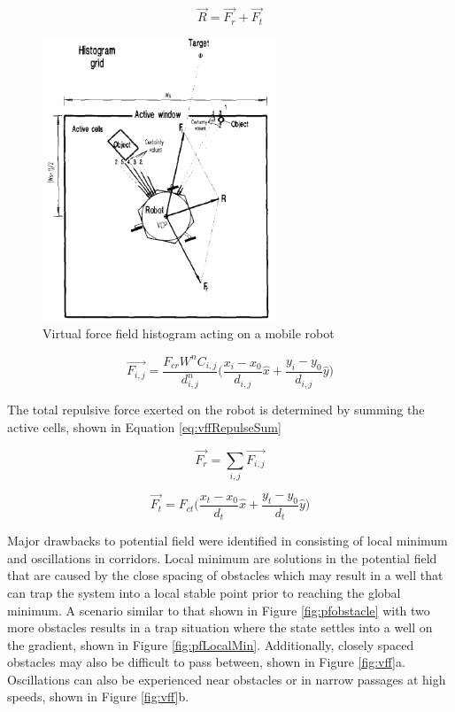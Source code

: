 \documentclass[numbered,pdftex]{ohio-etd}
\begin{document}
\begin{equation}\label{eq:vffHeading}
\overrightarrow{R} = \overrightarrow{F_r} + \overrightarrow{F_t}
\end{equation} 



\begin{figure}[H]
	\centering
	\includegraphics[width=7cm]{PaperFigures/histogram}
	\caption{Virtual force field histogram acting on a mobile robot \cite{borenstein_vector_1991}}
	\label{fig:histogram}
\end{figure}

\begin{equation}\label{eq:vffRepulse}
\overrightarrow{F_{i,j}} = \frac{F_{cr}W^nC_{i,j}}{d^n_{i,j}} \bigg( \frac{x_i-x_0}{d_{i,j}}\hat{x} + \frac{y_i-y_0}{d_{i,j}}\hat{y}\bigg)
\end{equation}

\noindent
The total repulsive force exerted on the robot is determined by summing the active cells, shown in Equation \ref{eq:vffRepulseSum}


\begin{equation}\label{eq:vffRepulseSum}
\overrightarrow{F_r} = \sum_{i,j}\overrightarrow{F_{i,j}}
\end{equation}


\begin{equation}\label{eq:vffGoal}
\overrightarrow{F_t} = F_{ct} \bigg( \frac{x_t-x_0}{d_{t}}\hat{x} + \frac{y_t-y_0}{d_{t}}\hat{y}\bigg)
\end{equation}


Major drawbacks to potential field were identified in \cite{koren_potential_1991} consisting of local minimum and oscillations in corridors. Local minimum are solutions in the potential field that are caused by the close spacing of obstacles which may result in a well that can trap the system into a local stable point prior to reaching the global minimum. A scenario similar to that shown in Figure \ref{fig:pfobstacle} with two more obstacles results in a trap situation where the state settles into a well on the gradient, shown in Figure \ref{fig:pfLocalMin}. Additionally, closely spaced obstacles may also be difficult to pass between, shown in Figure \ref{fig:vff}a. Oscillations can also be experienced near obstacles or in narrow passages at high speeds, shown in Figure \ref{fig:vff}b.
\end{document}
